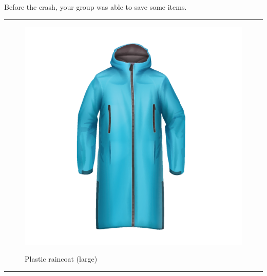 \documentclass{article}
\begin{document}
Before the crash, your group was able to save some items.\clearpage
        \par\noindent\rule{\textwidth}{0.4pt}
    \begin{figure}[H]
        \centering
        \begin{minipage}{0.25\textwidth}
            \centering
            \includegraphics[width=\textwidth]{../SurvivalItemImages/plasticraincoat}
        \end{minipage}\hfill
        \begin{minipage}{0.7\textwidth}
            \centering
            \Large Plastic raincoat (large)
        \end{minipage}
    \end{figure}
    \vspace{-0.8em}
    \noindent\rule{\textwidth}{0.4pt}
            
\end{document}
